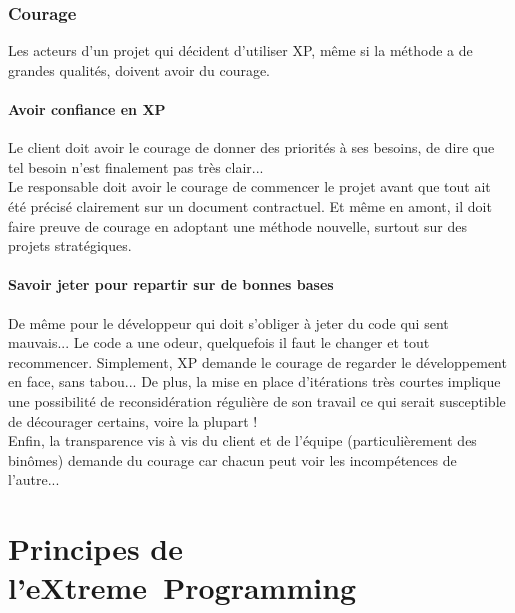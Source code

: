 \documentclass[]{article}
\let\oldparagraph\paragraph
\renewcommand{\paragraph}[1]{\oldparagraph{#1}\mbox{}}
\begin{document}
\hypertarget{courage}{%
\subsubsection{Courage}\label{courage}}

Les acteurs d'un projet qui décident d'utiliser XP, même si la méthode a
de grandes qualités, doivent avoir du courage.~


\hypertarget{avoir-confiance-en-xp}{%
\paragraph{Avoir confiance en XP}\label{avoir-confiance-en-xp}}

Le client doit avoir le courage de donner des priorités à ses besoins,
de dire que tel besoin n'est finalement pas très clair...~\\
Le responsable doit avoir le courage de commencer le projet avant que
tout ait été précisé clairement sur un document contractuel. Et même en
amont, il doit faire preuve de courage en adoptant une méthode nouvelle,
surtout sur des projets stratégiques.


\hypertarget{savoir-jeter-pour-repartir-sur-de-bonnes-bases}{%
\paragraph{Savoir jeter pour repartir sur de bonnes
bases}\label{savoir-jeter-pour-repartir-sur-de-bonnes-bases}}

De même pour le développeur qui doit s'obliger à jeter du code qui sent
mauvais... Le code a une odeur, quelquefois il faut le changer et tout
recommencer. Simplement, XP demande le courage de regarder le
développement en face, sans tabou... De plus, la mise en place
d'itérations très courtes implique une possibilité de reconsidération
régulière de son travail ce qui serait susceptible de décourager
certains, voire la plupart !\\
Enfin, la transparence vis à vis du client et de l'équipe
(particulièrement des binômes) demande du courage car chacun peut voir
les incompétences de l'autre...


\hypertarget{principes-de-lextreme-programming}{%
\section{\texorpdfstring{\textbf{Principes de
l'eXtreme~Programming}}{Principes de l'eXtreme~Programming}}\label{principes-de-lextreme-programming}}
\end{document}
